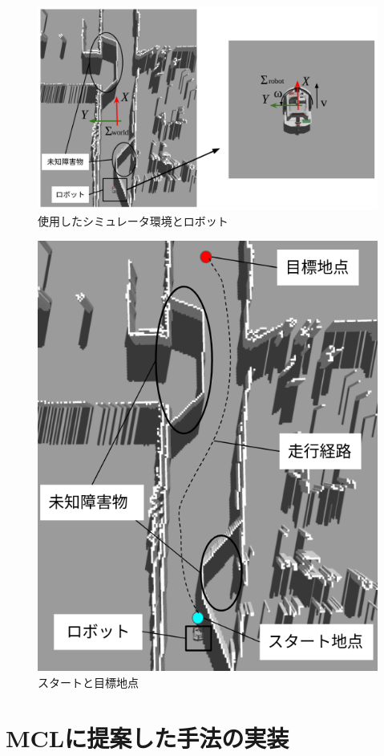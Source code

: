 \begin{figure}[h]
  \begin{center}
    \includegraphics[width=0.98\linewidth]{figs/sim_world.png}
    \caption{使用したシミュレータ環境とロボット}
    \label{fig:sim_world_experiment}
  \end{center}
\end{figure}

\newpage

\begin{figure}[H]
  \begin{center}
    \includegraphics[width=0.5\linewidth]{figs/gazebo_unknown_obstacles.png}
    \caption{スタートと目標地点}
    \label{fig:start_goal_sim}
  \end{center}
\end{figure}

\section{MCLに提案した手法の実装}

